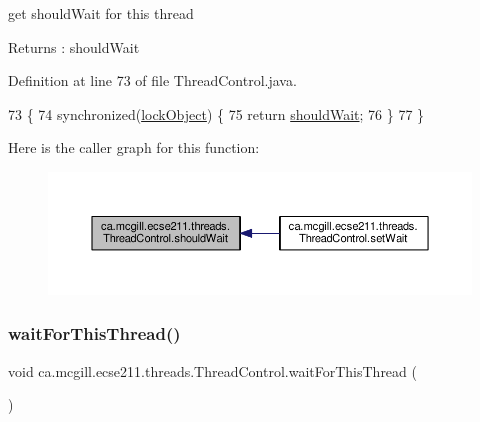 get should\+Wait for this thread \begin{DoxyReturn}{Returns}
\+: should\+Wait 
\end{DoxyReturn}


Definition at line 73 of file Thread\+Control.\+java.


\begin{DoxyCode}
73                               \{
74     \textcolor{keyword}{synchronized}(\hyperlink{classca_1_1mcgill_1_1ecse211_1_1threads_1_1_thread_control_ab20c44ff2dafab8981c42fa8bf634dfc}{lockObject}) \{
75       \textcolor{keywordflow}{return} \hyperlink{classca_1_1mcgill_1_1ecse211_1_1threads_1_1_thread_control_a9c3896500e86e402b8019e1be6500621}{shouldWait};
76     \}
77   \}
\end{DoxyCode}
Here is the caller graph for this function\+:\nopagebreak
\begin{figure}[H]
\begin{center}
\leavevmode
\includegraphics[width=350pt]{classca_1_1mcgill_1_1ecse211_1_1threads_1_1_thread_control_a9c3896500e86e402b8019e1be6500621_icgraph}
\end{center}
\end{figure}
\mbox{\label{classca_1_1mcgill_1_1ecse211_1_1threads_1_1_thread_control_a6a25ccb2d8916b8e6cc4b3bb0e9d2ed7}} 
\subsubsection{\texorpdfstring{wait\+For\+This\+Thread()}{waitForThisThread()}}
{\footnotesize\ttfamily void ca.\+mcgill.\+ecse211.\+threads.\+Thread\+Control.\+wait\+For\+This\+Thread (\begin{DoxyParamCaption}{ }\end{DoxyParamCaption})}

